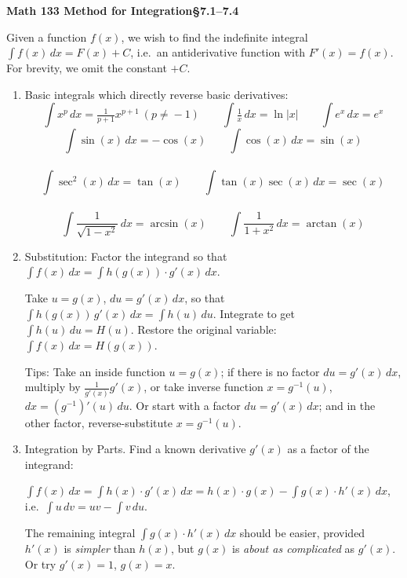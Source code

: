 \documentclass[10pt]{article}
\newcommand{\ts}{\textstyle}
\begin{document}
\vspace{-1em}

\centerline{\bf Math 133\hspace{1.5em} \hfill{\Large\bf
Method for Integration}\hfill \S7.1--7.4}
\vspace{1em}

\noindent 
Given a function $f(x)$, we wish to find the indefinite integral $\int\! f(x)\,dx=F(x)+C$,
i.e.~an antiderivative function with $F'(x)=f(x)$. For brevity,
we omit the constant $+C$.
\\[-2em]

\begin{enumerate}

\item  Basic integrals which directly reverse basic derivatives:
\\[-.8em]
$$\ts
\int\! x^p\,dx = \tfrac1{p+1}x^{p+1} \ (p\!\neq \!-1)
\qquad
\int\! \tfrac1x\,dx = \ln\!|x|
\qquad
\int\! e^x\,dx= e^x
$$
$$\ts
\int\! \sin(x)\,dx= -\cos(x)
\qquad
\int\! \cos(x)\,dx= \sin(x)
$$
\\[-2.2em]
$$\ts
\int\! \sec^2(x)\,dx= \tan(x)
\qquad
\int\! \tan(x)\sec(x)\,dx= \sec(x)
$$
\\[-2.5em]
$$\ts
\int\!\! \frac{1}{\sqrt{1{-}x^2}}\,dx = \arcsin(x)
\qquad
\int\!\! \frac{1}{1{+}x^2}\,dx = \arctan(x)
$$

\item  Substitution:
Factor the integrand so that $\int f(x)\,dx = \int h(g(x))\cdot g'(x)\,dx$.

Take $u=g(x)$, $du=g'(x)\,dx$,
so that $\int h(g(x))\, g'(x)\,dx
=\int h(u)\,du$. Integrate to get $\int h(u)\,du=H(u)$. Restore the original variable:
$\int f(x)\,dx = H(g(x))$.

Tips: Take an inside function $u=g(x)$; if there is no factor $du = g'(x)\,dx$, 
multiply by $\frac{1}{g'(x)}g'(x)$,
or take inverse function $x=g^{-1}(u)$, $dx=(g^{-1})'(u)\,du$.
Or start with a factor $du = g'(x)\,dx$;  
and in the other factor,
reverse-substitute $x=g^{-1}(u)$.

\item Integration by Parts. Find a known derivative $g'(x)$ as a factor of the integrand: 

$\int f(x)\,dx = \int h(x){\cdot} g'(x)\,dx
=h(x){\cdot} g(x)-\int g(x){\cdot} h'(x)\,dx$, 
i.e.~$\int u\,dv = uv-\int v\,du$.

The remaining integral $\int g(x){\cdot} h'(x)\,dx$ should be easier,
provided $h'(x)$ is {\it simpler} than $h(x)$, but 
$g(x)$ is {\it about as complicated} as $g'(x)$.
Or try $g'(x)=1$, $g(x)=x$.


\end{enumerate}
\end{document}
